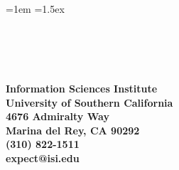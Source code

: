 


\parindent=1em
\parskip=1.5ex

\begin{center}

\\[1.5ex]
\\[1.5ex]
\\[1.5ex]

{\bf
\hspace{1mm}\\
Information Sciences Institute\\
University of Southern California \\
4676 Admiralty Way \\
Marina del Rey, CA 90292 \\
(310) 822-1511 \\
expect@isi.edu \\
}

\end{center}




